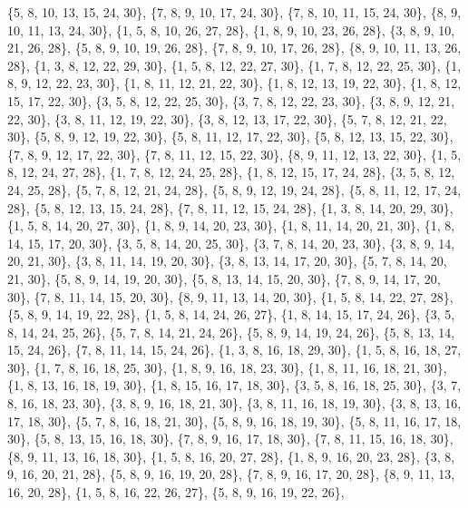 \documentclass[11pt,a4paper]{article}
\begin{document}
{\{5, 8, 10, 13, 15, 24, 30\}, \{7, 8, 9, 10, 17, 24, 30\}, \{7, 8, 10, 11, 15, 24, 30\}, \{8, 9, 10, 11, 13, 24, 30\}, \{1, 5, 8, 10, 26, 27, 28\},
\{1, 8, 9, 10, 23, 26, 28\}, \{3, 8, 9, 10, 21, 26, 28\}, \{5, 8, 9, 10, 19, 26, 28\}, \{7, 8, 9, 10, 17, 26, 28\}, \{8, 9, 10, 11, 13, 26, 28\},
\{1, 3, 8, 12, 22, 29, 30\}, \{1, 5, 8, 12, 22, 27, 30\}, \{1, 7, 8, 12, 22, 25, 30\}, \{1, 8, 9, 12, 22, 23, 30\}, \{1, 8, 11, 12, 21, 22, 30\},
\{1, 8, 12, 13, 19, 22, 30\}, \{1, 8, 12, 15, 17, 22, 30\}, \{3, 5, 8, 12, 22, 25, 30\}, \{3, 7, 8, 12, 22, 23, 30\}, \{3, 8, 9, 12, 21, 22, 30\},
\{3, 8, 11, 12, 19, 22, 30\}, \{3, 8, 12, 13, 17, 22, 30\}, \{5, 7, 8, 12, 21, 22, 30\}, \{5, 8, 9, 12, 19, 22, 30\}, \{5, 8, 11, 12, 17, 22, 30\},
\{5, 8, 12, 13, 15, 22, 30\}, \{7, 8, 9, 12, 17, 22, 30\}, \{7, 8, 11, 12, 15, 22, 30\}, \{8, 9, 11, 12, 13, 22, 30\}, \{1, 5, 8, 12, 24, 27, 28\},
\{1, 7, 8, 12, 24, 25, 28\}, \{1, 8, 12, 15, 17, 24, 28\}, \{3, 5, 8, 12, 24, 25, 28\}, \{5, 7, 8, 12, 21, 24, 28\}, \{5, 8, 9, 12, 19, 24, 28\},
\{5, 8, 11, 12, 17, 24, 28\}, \{5, 8, 12, 13, 15, 24, 28\}, \{7, 8, 11, 12, 15, 24, 28\}, \{1, 3, 8, 14, 20, 29, 30\}, \{1, 5, 8, 14, 20, 27, 30\},
\{1, 8, 9, 14, 20, 23, 30\}, \{1, 8, 11, 14, 20, 21, 30\}, \{1, 8, 14, 15, 17, 20, 30\}, \{3, 5, 8, 14, 20, 25, 30\}, \{3, 7, 8, 14, 20, 23, 30\},
\{3, 8, 9, 14, 20, 21, 30\}, \{3, 8, 11, 14, 19, 20, 30\}, \{3, 8, 13, 14, 17, 20, 30\}, \{5, 7, 8, 14, 20, 21, 30\}, \{5, 8, 9, 14, 19, 20, 30\},
\{5, 8, 13, 14, 15, 20, 30\}, \{7, 8, 9, 14, 17, 20, 30\}, \{7, 8, 11, 14, 15, 20, 30\}, \{8, 9, 11, 13, 14, 20, 30\}, \{1, 5, 8, 14, 22, 27, 28\},
\{5, 8, 9, 14, 19, 22, 28\}, \{1, 5, 8, 14, 24, 26, 27\}, \{1, 8, 14, 15, 17, 24, 26\}, \{3, 5, 8, 14, 24, 25, 26\}, \{5, 7, 8, 14, 21, 24, 26\},
\{5, 8, 9, 14, 19, 24, 26\}, \{5, 8, 13, 14, 15, 24, 26\}, \{7, 8, 11, 14, 15, 24, 26\}, \{1, 3, 8, 16, 18, 29, 30\}, \{1, 5, 8, 16, 18, 27, 30\},
\{1, 7, 8, 16, 18, 25, 30\}, \{1, 8, 9, 16, 18, 23, 30\}, \{1, 8, 11, 16, 18, 21, 30\}, \{1, 8, 13, 16, 18, 19, 30\}, \{1, 8, 15, 16, 17, 18, 30\},
\{3, 5, 8, 16, 18, 25, 30\}, \{3, 7, 8, 16, 18, 23, 30\}, \{3, 8, 9, 16, 18, 21, 30\}, \{3, 8, 11, 16, 18, 19, 30\}, \{3, 8, 13, 16, 17, 18, 30\},
\{5, 7, 8, 16, 18, 21, 30\}, \{5, 8, 9, 16, 18, 19, 30\}, \{5, 8, 11, 16, 17, 18, 30\}, \{5, 8, 13, 15, 16, 18, 30\}, \{7, 8, 9, 16, 17, 18, 30\},
\{7, 8, 11, 15, 16, 18, 30\}, \{8, 9, 11, 13, 16, 18, 30\}, \{1, 5, 8, 16, 20, 27, 28\}, \{1, 8, 9, 16, 20, 23, 28\}, \{3, 8, 9, 16, 20, 21, 28\},
\{5, 8, 9, 16, 19, 20, 28\}, \{7, 8, 9, 16, 17, 20, 28\}, \{8, 9, 11, 13, 16, 20, 28\}, \{1, 5, 8, 16, 22, 26, 27\}, \{5, 8, 9, 16, 19, 22, 26\},
}
\end{document}
